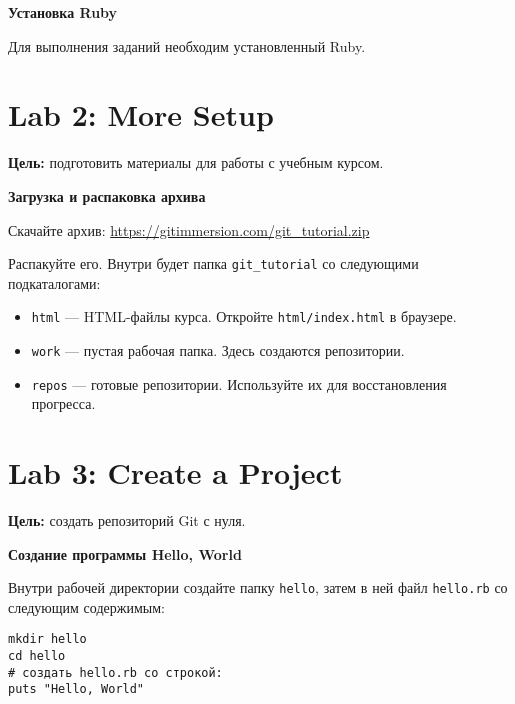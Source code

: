 \documentclass[a4paper,12pt]{report}
\begin{document}
\textbf{Установка Ruby}

Для выполнения заданий необходим установленный Ruby.


\section{Lab 2: More Setup}
\textbf{Цель:} подготовить материалы для работы с учебным курсом.

\textbf{Загрузка и распаковка архива}

Скачайте архив: \url{https://gitimmersion.com/git_tutorial.zip}

Распакуйте его. Внутри будет папка \texttt{git\_tutorial} со следующими подкаталогами:
\begin{itemize}
  \item \texttt{html} — HTML-файлы курса. Откройте \texttt{html/index.html} в браузере.
  \item \texttt{work} — пустая рабочая папка. Здесь создаются репозитории.
  \item \texttt{repos} — готовые репозитории. Используйте их для восстановления прогресса.
\end{itemize}


\section{Lab 3: Create a Project}
\textbf{Цель:} создать репозиторий Git с нуля.

\textbf{Создание программы Hello, World}

Внутри рабочей директории создайте папку \texttt{hello}, затем в ней файл \texttt{hello.rb} со следующим содержимым:

\begin{verbatim}
mkdir hello
cd hello
# создать hello.rb со строкой:
puts "Hello, World"
\end{verbatim}

\end{document}
